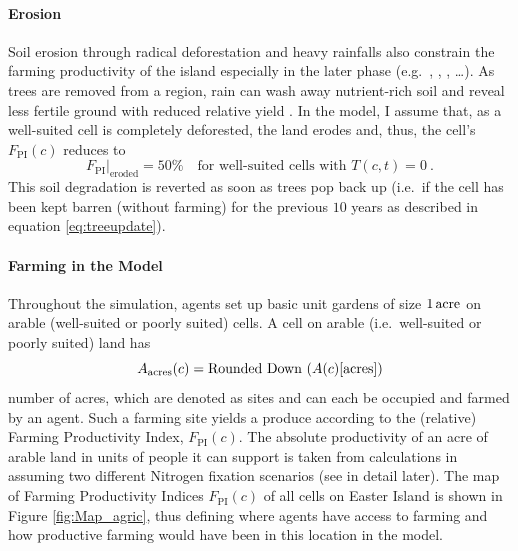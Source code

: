 \paragraph{Erosion}
Soil erosion through radical deforestation and heavy rainfalls also constrain the farming productivity of the island especially in the later phase (e.g.\ \citet{Brander1998}, \citet{Mieth2005}, \citet{Bahn2017}, \ldots).
As trees are removed from a region, rain can wash away nutrient-rich soil and reveal less fertile ground with reduced relative yield \citet{Mieth2005}.
In the model, I assume that, as a well-suited cell is completely deforested, the land erodes and, thus, the cell's $F_\text{PI}(c)$ reduces to 
\begin{equation}
F_\text{PI}|_\text{eroded}=50\% \quad \text{for well-suited cells with } T(c,t)=0 \ .
\end{equation}
This soil degradation is reverted as soon as trees pop back up (i.e.\ if the cell has been kept barren (without farming) for the previous $10$ years as described in equation \ref{eq:treeupdate}).

\paragraph{Farming in the Model}
Throughout the simulation, agents set up basic unit gardens of size $1\, {\rm acre}$ on arable (well-suited or poorly suited) cells.%
A cell on arable (i.e.\ well-suited or poorly suited) land has
\begin{equation}
A_{\rm acres}(c) = \text{Rounded Down }(A(c)[\text{acres}])
\end{equation}
number of acres, which are denoted as sites and can each be occupied and farmed by an agent.
Such a farming site yields a produce according to the (relative) Farming Productivity Index, $F_\text{PI}(c)$.
The absolute productivity of an acre of arable land in units of people it can support is taken from calculations in \citet{Puleston2017} assuming two different Nitrogen fixation scenarios (see in detail later).
The map of Farming Productivity Indices $F_\text{PI}(c)$ of all cells on Easter Island is shown in Figure \ref{fig:Map_agric}, thus defining where agents have access to farming and how productive farming would have been in this location in the model. 

